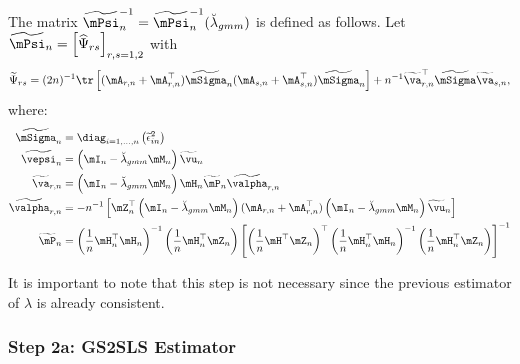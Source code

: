 The matrix $\widetilde{\mPsi}^{-1}_n= \widetilde{\mPsi}^{-1}_n (\breve{\lambda}_{gmm})$ is defined as follows. Let $\widetilde{\mPsi}_n = \left[\widehat{\Psi}_{rs}\right]_{r,s = 1, 2}$ with
\begin{equation*}
\widetilde{\Psi}_{rs} = (2n)^{-1}\tr\left[(\mA_{r, n} + \mA_{r, n}^\top)\widetilde{\mSigma}_n(\mA_{s, n} + \mA_{s, n}^\top)\widetilde{\mSigma}_n\right] + n^{-1}\widetilde{\va}_{r, n}^\top\widetilde{\mSigma}\widetilde{\va}_{s, n},
\end{equation*}
%
where:
\begin{equation*}
  \begin{aligned}
    \widetilde{\mSigma}_n  & = \diag_{i=1, \ldots,n}\left(\widetilde{\epsilon}_{in}^2\right) \\
    \widetilde{\vepsi}_n   & = \left(\mI_n - \breve{\lambda}_{gmm}\mM_n\right)\widetilde{\vu}_n \\
    \widetilde{\va}_{r,n} & = \left(\mI_n - \breve{\lambda}_{gmm}\mM_n\right)\mH_n\widetilde{\mP}_n\widetilde{\valpha}_{r,n} \\
    \widetilde{\valpha}_{r,n} & = - n^{-1}\left[\mZ^\top_n\left(\mI_n - \breve{\lambda}_{gmm}\mM _n\right)(\mA_{r, n} + \mA_{r, n}^\top)\left(\mI_n - \breve{\lambda}_{gmm}\mM_n\right)\widetilde{\vu}_n\right] \\
    \widetilde{\mP}_n & = \left(\frac{1}{n}\mH^\top_n\mH_n\right)^{-1}\left(\frac{1}{n}\mH_n^\top\mZ_n \right)\left[\left(\frac{1}{n}\mH^\top\mZ_n\right)^\top\left(\frac{1}{n}\mH^\top_n\mH_n\right)^{-1}\left(\frac{1}{n}\mH^\top_n\mZ_n\right)\right]^{-1}
  \end{aligned}
\end{equation*}

It is important to note that this step is not necessary since the previous estimator of $\lambda$ is already consistent. 

\subsubsection{Step 2a: GS2SLS Estimator}

